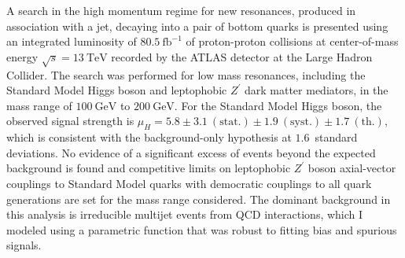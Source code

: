 A search in the high momentum regime for new resonances, produced in association with a jet, decaying into a pair of bottom quarks is presented using an integrated luminosity of $80.5~\mathrm{fb}^{-1}$ of proton-proton collisions at center-of-mass energy $\sqrt{s}=13~\mathrm{TeV}$ recorded by the ATLAS detector at the Large Hadron Collider.
The search was performed for low mass resonances, including the Standard Model Higgs boson and leptophobic $Z^{\prime}$ dark matter mediators, in the mass range of $100~\mathrm{GeV}$ to $200~\mathrm{GeV}$.
For the Standard Model Higgs boson, the observed signal strength is $\mu_{H} = 5.8 \pm 3.1~\mathrm{(stat.)} \pm 1.9~\mathrm{(syst.)} \pm 1.7~\mathrm{(th.)}$, which is consistent with the background-only hypothesis at $1.6$~standard deviations.
No evidence of a significant excess of events beyond the expected background is found and competitive limits on leptophobic $Z^{\prime}$ boson axial-vector couplings to Standard Model quarks with democratic couplings to all quark generations are set for the mass range considered.
The dominant background in this analysis is irreducible multijet events from QCD interactions, which I modeled using a parametric function that was robust to fitting bias and spurious signals.
